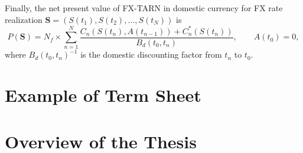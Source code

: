 Finally, the net present value of FX-TARN in domestic currency for FX rate realization $\mathbf{S} = (S(t_1),S(t_2),\ldots,S(t_N))$ is
\[P(\mathbf{S}) =N_f \times \sum_{n=1}^N\frac{C_n(S(t_n),A(t_{n-1}))+C^\ast_n(S(t_n))}{B_d(t_0,t_n)}, \qquad A(t_0)=0,\]
where $B_d(t_0,t_n)^{-1}$ is the domestic discounting factor from $t_n$ to $t_0$.

\section{Example of Term Sheet}
\label{sec:intro:term_sheet}

\section{Overview of the Thesis}
\label{sec:intro:overview}
